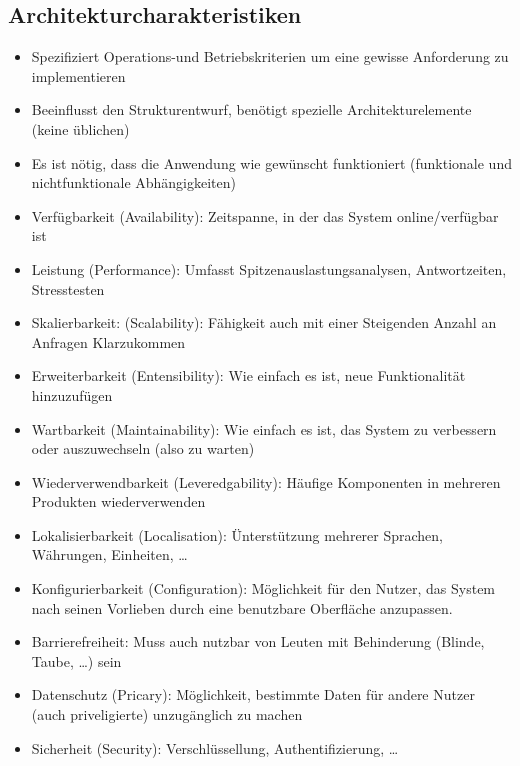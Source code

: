 \documentclass[ngerman]{tuda_summary}
\begin{document}
\subsection{Architekturcharakteristiken}
\begin{definition}[Architekturcharakteristik]\begin{itemize}
        \item Spezifiziert Operations-und Betriebskriterien um eine gewisse Anforderung zu implementieren
        \item Beeinflusst den Strukturentwurf, benötigt spezielle Architekturelemente (keine üblichen)
        \item Es ist nötig, dass die Anwendung wie gewünscht funktioniert (funktionale und nichtfunktionale Abhängigkeiten)
    \end{itemize}
\end{definition}
\begin{itemize}
    \item Verfügbarkeit (Availability): Zeitspanne, in der das System online/verfügbar ist
    \item Leistung (Performance): Umfasst Spitzenauslastungsanalysen, Antwortzeiten, Stresstesten
    \item Skalierbarkeit: (Scalability): Fähigkeit auch mit einer Steigenden Anzahl an Anfragen Klarzukommen
\end{itemize}
\begin{itemize}
    \item Erweiterbarkeit (Entensibility): Wie einfach es ist, neue Funktionalität hinzuzufügen
    \item Wartbarkeit (Maintainability): Wie einfach es ist, das System zu verbessern oder auszuwechseln (also zu warten)
    \item Wiederverwendbarkeit (Leveredgability): Häufige Komponenten in mehreren Produkten wiederverwenden
    \item Lokalisierbarkeit (Localisation): Ünterstützung mehrerer Sprachen, Währungen, Einheiten, \dots
    \item Konfigurierbarkeit (Configuration): Möglichkeit für den Nutzer, das System nach seinen Vorlieben durch eine benutzbare Oberfläche anzupassen.
\end{itemize}
\begin{itemize}
    \item Barrierefreiheit: Muss auch nutzbar von Leuten mit Behinderung (Blinde, Taube, \dots) sein
    \item Datenschutz (Pricary): Möglichkeit, bestimmte Daten für andere Nutzer (auch priveligierte) unzugänglich zu machen
    \item Sicherheit (Security): Verschlüssellung, Authentifizierung, \dots
\end{itemize}
\end{document}
